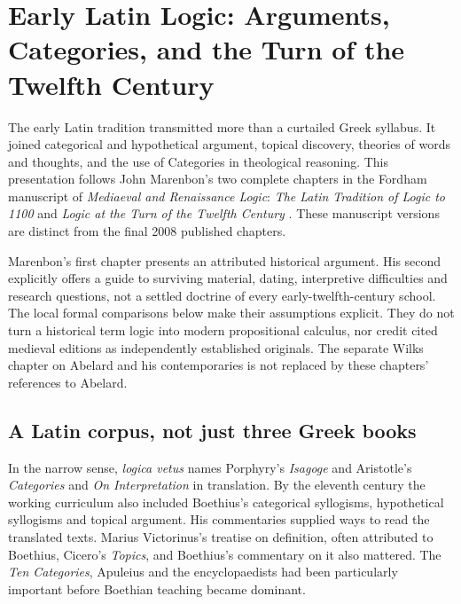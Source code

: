 \chapter{Early Latin Logic: Arguments, Categories, and the Turn of the Twelfth Century}
\label{sec:p13-early-medieval-latin-logic}

The early Latin tradition transmitted more than a curtailed Greek syllabus.
It joined categorical and hypothetical argument, topical discovery, theories
of words and thoughts, and the use of Categories in theological reasoning.
This presentation follows John Marenbon's two complete chapters in the
Fordham manuscript of \emph{Mediaeval and Renaissance Logic}:
\emph{The Latin Tradition of Logic to 1100} and
\emph{Logic at the Turn of the Twelfth Century}
\cite[pp.~1--63]{Marenbon2007FordhamEarlyLatin}
\cite[pp.~65--81]{Marenbon2007FordhamTurnTwelfth}.
These manuscript versions are distinct from the final 2008 published chapters.

Marenbon's first chapter presents an attributed historical argument.
His second explicitly offers a guide to surviving material, dating,
interpretive difficulties and research questions, not a settled doctrine
of every early-twelfth-century school. The local formal comparisons below
make their assumptions explicit. They do not turn a historical term logic
into modern propositional calculus, nor credit cited medieval editions
as independently established originals. The separate Wilks chapter on
Abelard and his contemporaries is not replaced by these chapters'
references to Abelard.

\section{A Latin corpus, not just three Greek books}
\label{sec:p13-early-latin-corpus}

In the narrow sense, \emph{logica vetus} names Porphyry's \emph{Isagoge}
and Aristotle's \emph{Categories} and \emph{On Interpretation} in translation.
By the eleventh century the working curriculum also included Boethius's
categorical syllogisms, hypothetical syllogisms and topical argument.
His commentaries supplied ways to read the translated texts.
Marius Victorinus's treatise on definition, often attributed to Boethius,
Cicero's \emph{Topics}, and Boethius's commentary on it also mattered.
The \emph{Ten Categories}, Apuleius and the encyclopaedists had been
particularly important before Boethian teaching became dominant.

